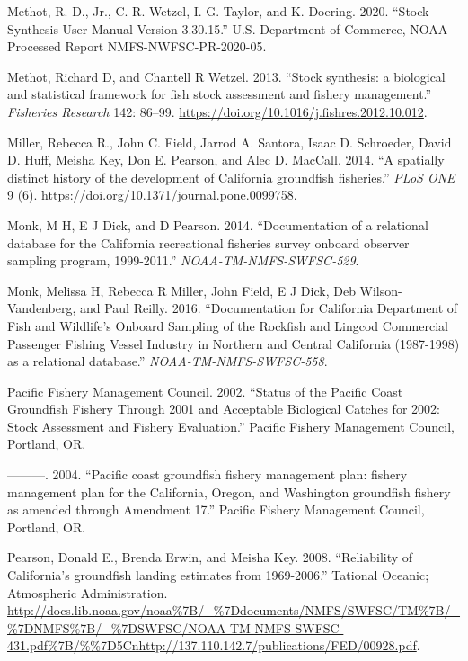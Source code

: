 \documentclass[
  english,
  a4paper,
]{article}
\newlength{\cslhangindent}
\newlength{\cslentryspacingunit} %
\newenvironment{CSLReferences}[2] %
 {%
  \setlength{\parindent}{0pt}
  \ifodd #1
  \let\oldpar\par
  \def\par{\hangindent=\cslhangindent\oldpar}
  \fi
  \setlength{\parskip}{#2\cslentryspacingunit}
 }%
 {}
\begin{document}
\begin{CSLReferences}{1}{0}
\leavevmode{}%
Methot, R. D., Jr., C. R. Wetzel, I. G. Taylor, and K. Doering. 2020. {``{Stock Synthesis User Manual Version 3.30.15}.''} U.S. Department of Commerce, NOAA Processed Report NMFS-NWFSC-PR-2020-05.

\leavevmode{}%
Methot, Richard D, and Chantell R Wetzel. 2013. {``{Stock synthesis: a biological and statistical framework for fish stock assessment and fishery management}.''} \emph{Fisheries Research} 142: 86--99. \url{https://doi.org/10.1016/j.fishres.2012.10.012}.

\leavevmode{}%
Miller, Rebecca R., John C. Field, Jarrod A. Santora, Isaac D. Schroeder, David D. Huff, Meisha Key, Don E. Pearson, and Alec D. MacCall. 2014. {``{A spatially distinct history of the development of California groundfish fisheries}.''} \emph{PLoS ONE} 9 (6). \url{https://doi.org/10.1371/journal.pone.0099758}.

\leavevmode{}%
Monk, M H, E J Dick, and D Pearson. 2014. {``{Documentation of a relational database for the California recreational fisheries survey onboard observer sampling program, 1999-2011}.''} \emph{NOAA-TM-NMFS-SWFSC-529}.

\leavevmode{}%
Monk, Melissa H, Rebecca R Miller, John Field, E J Dick, Deb Wilson-Vandenberg, and Paul Reilly. 2016. {``{Documentation for California Department of Fish and Wildlife's Onboard Sampling of the Rockfish and Lingcod Commercial Passenger Fishing Vessel Industry in Northern and Central California (1987-1998) as a relational database}.''} \emph{NOAA-TM-NMFS-SWFSC-558}.

\leavevmode{}%
Pacific Fishery Management Council. 2002. {``{Status of the Pacific Coast Groundfish Fishery Through 2001 and Acceptable Biological Catches for 2002: Stock Assessment and Fishery Evaluation.}''} Pacific Fishery Management Council, Portland, OR.

\leavevmode{}%
---------. 2004. {``{Pacific coast groundfish fishery management plan: fishery management plan for the California, Oregon, and Washington groundfish fishery as amended through Amendment 17}.''} Pacific Fishery Management Council, Portland, OR.

\leavevmode{}%
Pearson, Donald E., Brenda Erwin, and Meisha Key. 2008. {``{Reliability of California's groundfish landing estimates from 1969-2006}.''} Tational Oceanic; Atmospheric Administration. \url{http://docs.lib.noaa.gov/noaa\%7B/_\%7Ddocuments/NMFS/SWFSC/TM\%7B/_\%7DNMFS\%7B/_\%7DSWFSC/NOAA-TM-NMFS-SWFSC-431.pdf\%7B/\%\%7D5Cnhttp://137.110.142.7/publications/FED/00928.pdf}.


\end{CSLReferences}
\end{document}
